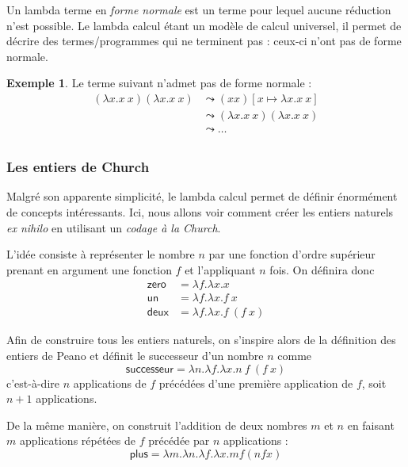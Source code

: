 \documentclass{article}
\theoremstyle{definition}
\newtheorem{example}{Exemple}
\theoremstyle{remark}
\begin{document}
Un lambda terme en \emph{forme normale} est un terme pour lequel
aucune réduction n'est possible. Le lambda calcul étant un modèle de
calcul universel, il permet de décrire des termes/programmes qui ne
terminent pas : ceux-ci n'ont pas de forme normale.

\begin{example}
 
  Le terme suivant n'admet pas de forme normale :
  \begin{align*}
  (\lambda x. x\: x) (\lambda x. x\: x) &\leadsto (x x)[x \mapsto \lambda x. x\: x] \\
                                        &\leadsto (\lambda x. x\: x) (\lambda x. x\: x) \\
                                        &\leadsto \ldots \\
  \end{align*}
\end{example}

\subsubsection{Les entiers de Church}

Malgré son apparente simplicité, le lambda calcul permet de définir
énormément de concepts intéressants. Ici, nous allons voir comment créer
les entiers naturels \textit{ex nihilo} en utilisant un \emph{codage à
  la Church}.

L'idée consiste à représenter le nombre \(n\) par une fonction d'ordre
supérieur prenant en argument une fonction \(f\) et l'appliquant \(n\)
fois. On définira donc 
%
\begin{align*}
\mathsf{zero} &= \lambda f. \lambda x. x \\
\mathsf{un}   &= \lambda f. \lambda x. f\: x \\
\mathsf{deux} &= \lambda f. \lambda x. f\: (f\: x)
\end{align*}

Afin de construire tous les entiers naturels, on s'inspire alors de la
définition des entiers de Peano et définit le successeur d'un nombre \(n\)
comme
%
\[
\mathsf{successeur} = \lambda n. \lambda f. \lambda x. n\: f\: (f\: x)
\]
%
c'est-à-dire \(n\) applications de \(f\) précédées d'une première
application de \(f\), soit \(n+1\) applications.

De la même manière, on construit l'addition de deux nombres \(m\) et
\(n\) en faisant \(m\) applications répétées de \(f\) précédée par
\(n\) applications :
%
\[
\mathsf{plus} = \lambda m. \lambda n. \lambda f. \lambda x. m f (n f x)
\]
\end{document}
